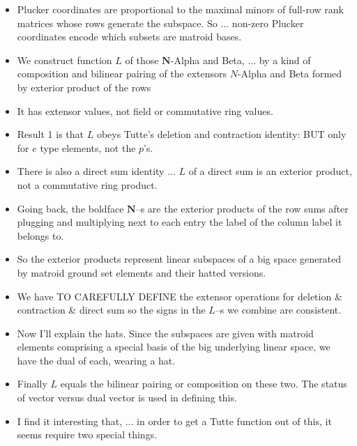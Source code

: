 \documentclass[14pt]{extarticle}
\begin{document}
{\begin{itemize}
      \item
        Plucker coordinates are proportional to the maximal minors of
        full-row rank matrices whose rows generate the subspace.  So ... non-zero Plucker coordinates encode
    which subsets are matroid bases.  

  \item We construct function $L$ of those
    $\mathbf{N}$-Alpha and Beta, ... by a
    kind of composition and bilinear pairing of the extensors $N$-Alpha and Beta formed by
    exterior product of the rows

  \item It has extensor values,
    not field or commutative ring values. 

\item Result 1 is that $L$ obeys Tutte's deletion and contraction identity:  BUT
  only for $e$ type elements, not the $p$'s.  

\item There is also a direct sum identity ... $L$ of a direct sum is an exterior product, not
  a commutative ring product.

\item
  Going back, the boldface $\mathbf{N}$--s are the exterior products of the row sums
  after plugging and multiplying next to each entry the label of the column label it belongs to.
  
\item
  So the exterior products
   represent linear subspaces of a big space generated
  by matroid ground set elements and their hatted versions.  

\item We have TO CAREFULLY DEFINE the extensor operations for deletion \&
  contraction \& direct sum so the signs in the $L$--s we combine are consistent.

\item Now I'll explain the hats. Since the subspaces are given with matroid elements comprising
  a special basis of the big underlying linear space, we have the dual of each, wearing a hat. 
  
\item
  Finally $L$ equals the bilinear pairing or composition on these two.  The status
  of vector versus dual vector is used in defining this.

\item
  I find it interesting that, ... in order to get a Tutte function out
  of this, it seems require two special things.


\end{itemize}}
\end{document}
